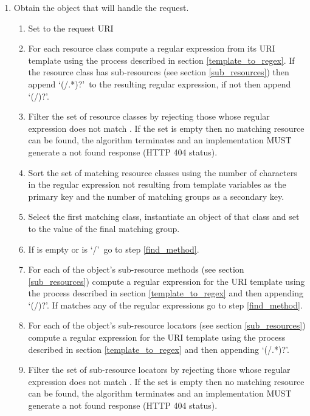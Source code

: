 \begin{enumerate}
\item Obtain the object that will handle the request.

\begin{enumerate}
\item Set  to the request URI

\item For each resource class compute a regular expression from its URI template using the process described in section \ref{template_to_regex}. If the resource class has sub-resources (see section \ref{sub_resources}) then append \lq(/.*)?\rq\ to the resulting regular expression, if not then append \lq(/)?\rq.

\item Filter the set of resource classes by rejecting those whose regular expression does not match . If the set is empty then no matching resource can be found, the algorithm terminates and an implementation MUST generate a not found response (HTTP 404 status).

\item Sort the set of matching resource classes using the number of characters in the regular expression not resulting from template variables as the primary key and the number of matching groups as a secondary key.

\item Select the first matching class, instantiate an object of that class and set  to the value of the final matching group.

\item\label{check_uri} If  is empty or is \lq/\rq\ go to step \ref{find_method}.

\item For each of the object's sub-resource methods (see section \ref{sub_resources}) compute a regular expression for the URI template using the process described in section \ref{template_to_regex} and then appending \lq(/)?\rq. If  matches any of the regular expressions go to step \ref{find_method}.

\item For each of the object's sub-resource locators (see section \ref{sub_resources}) compute a regular expression for the URI template using the process described in section \ref{template_to_regex} and then appending \lq(/.*)?\rq.

\item Filter the set of sub-resource locators by rejecting those whose regular expression does not match . If the set is empty then no matching resource can be found, the algorithm terminates and an implementation MUST generate a not found response (HTTP 404 status).


\end{enumerate}
\end{enumerate}
